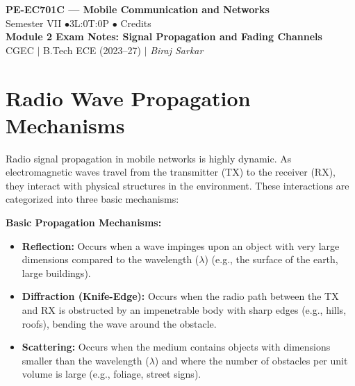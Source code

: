 \documentclass[12pt,a4paper]{article}
\begin{document}

\begin{center}
  {\LARGE\bfseries\color{myred} PE-EC701C --- Mobile Communication and Networks}\\[5pt]
  {\normalsize\color{mydark} Semester VII \quad$\bullet$\quad 3L:0T:0P \quad$\bullet$ Credits}\\[3pt]
  {\normalsize\color{myteal}\textbf{Module 2 Exam Notes: Signal Propagation and Fading Channels}}\\[3pt]
  {\small\color{mydark} CGEC \;$|$\; B.Tech ECE (2023--27) \;$|$\; \textit{Biraj Sarkar}}
\end{center}
\noindent{\color{myred}\rule{\linewidth}{1.5pt}}
\vspace{2pt}

\hypersetup{linkcolor=mydark}
\tableofcontents
\hypersetup{linkcolor=myteal}
\newpage

\section{Radio Wave Propagation Mechanisms}

Radio signal propagation in mobile networks is highly dynamic. As electromagnetic waves travel from the transmitter (TX) to the receiver (RX), they interact with physical structures in the environment. These interactions are categorized into three basic mechanisms:

\begin{tcolorbox}[defbox]
\textbf{Basic Propagation Mechanisms:}
\begin{itemize}[leftmargin=*, itemsep=3pt, topsep=0pt]
  \item \textbf{Reflection:} Occurs when a wave impinges upon an object with very large dimensions compared to the wavelength ($\lambda$) (e.g., the surface of the earth, large buildings).
  \item \textbf{Diffraction (Knife-Edge):} Occurs when the radio path between the TX and RX is obstructed by an impenetrable body with sharp edges (e.g., hills, roofs), bending the wave around the obstacle.
  \item \textbf{Scattering:} Occurs when the medium contains objects with dimensions smaller than the wavelength ($\lambda$) and where the number of obstacles per unit volume is large (e.g., foliage, street signs).
\end{itemize}
\end{tcolorbox}
\end{document}
